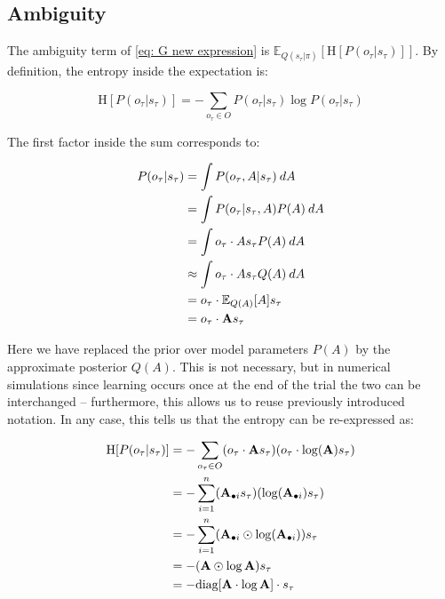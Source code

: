 \documentclass[review,12pt,authoryear]{elsarticle}
\begin{document}
	\subsection{Ambiguity}
	
	The ambiguity term of \eqref{eq: G new expression} is $\mathbb E_{Q(s_\tau|\pi)} [\text{H}[P(o_\tau |s_\tau)]]$. By definition, the entropy inside the expectation is:
	
	\begin{equation}
	\text{H}[P(o_\tau |s_\tau )]=-\sum_{o_\tau \in O} P(o_\tau |s_\tau )\log P(o_\tau|s_\tau ) 
	\end{equation}
	
	The first factor inside the sum corresponds to:
	
	\begin{equation}
		\begin{split}
			P(o_\tau |s_\tau) &=\int P(o_\tau,A|s_\tau)\: dA \\
			&=\int P(o_\tau |s_\tau,A)P(A)\:dA \\
			&=\int o_\tau \cdot As_\tau P(A)\:dA \\
			&\approx \int o_\tau \cdot As_\tau Q(A) \: dA \\
			&= o_\tau \cdot \mathbb E_{ Q ( A )} [A] s_\tau  \\
			&=o_\tau \cdot \bold As_\tau 
		\end{split}
	\end{equation}

	Here we have replaced the prior over model parameters $P( A)$ by the approximate posterior $Q( A)$. This is not necessary, but in numerical simulations since learning occurs once at the end of the trial the two can be interchanged -- furthermore, this allows us to reuse previously introduced notation. In any case, this tells us that the entropy can be re-expressed as:
	
	\begin{equation}
		\begin{split}
			\text{H}[P(o_\tau |s_\tau )] &= - \sum_{o_\tau \in O} (o_\tau \cdot \bold As_\tau )(o_\tau \cdot \log (\bold A)s_\tau ) \\
		&= - \sum_{i=1}^n (\bold A_{\bullet i}s_\tau)(\log(\bold A_{\bullet i})s_\tau) \\
		&= - \sum_{i=1}^n (\bold A_{\bullet i}\odot \log (\bold A_{\bullet i}))s_\tau \\
		&= - (\bold A\odot \log \bold A)s_\tau\\
		&= - \text{diag} [\bold A \cdot \log \bold A ] \cdot s_\tau 
		\end{split}
	\end{equation}
	
\end{document}
